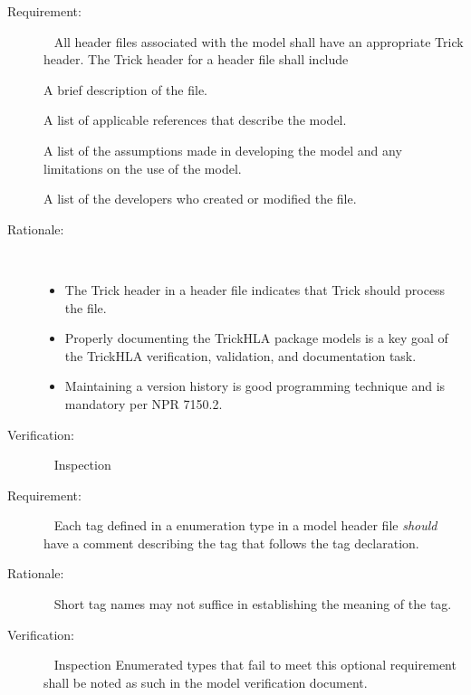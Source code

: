 \documentclass[twoside,11pt,titlepage]{report}
\begin{document}
\label{reqt:h_trick_header}
\begin{description}
  \item[Requirement:]\ \newline
    All header files associated with the model shall have an appropriate
    Trick header.  The Trick header for a header file shall include

    \label{reqt:h_trick_header_purpose}
      A brief description of the file.

    \label{reqt:h_trick_header_refs}
      A list of applicable references that describe the model.

    \label{reqt:h_trick_header_assum}
      A list of the assumptions made in developing the model and
      any limitations on the use of the model.

    \label{reqt:h_trick_header_prog}
      A list of the developers who created or modified the file.

  \item[Rationale:]\ \\[-20pt]
    \begin{itemize}
      \item The Trick header in a header file
        indicates that Trick should process the file.
      \item Properly documenting the TrickHLA package models
        is a key goal of the TrickHLA verification,
        validation, and documentation task.
      \item Maintaining a version history is good programming
        technique and is mandatory per NPR 7150.2.
    \end{itemize}

  \item[Verification:]\ \newline
    Inspection
\end{description}

\label{reqt:enum_trick_comments}
\begin{description}
  \item[Requirement:]\ \newline
    Each tag defined in a enumeration type in a model header
    file {\em should} have a comment describing the tag that follows
    the tag declaration.

  \item[Rationale:]\ \newline
    Short tag names may not suffice in establishing
    the meaning of the tag.

  \item[Verification:]\ \newline
    Inspection \newline
    Enumerated types that fail to meet this optional requirement
    shall be noted as such in the model verification document.
\end{description}
\end{document}
